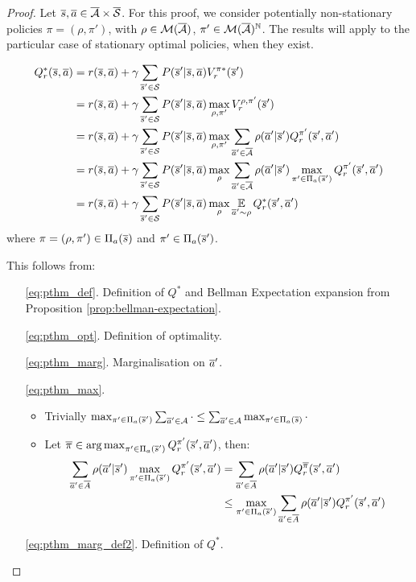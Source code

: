 \begin{proof}
Let $\overline{s}, \overline{a} \in \overline{\mathcal{A}}\times\overline{\mathcal{S}}$. For this proof, we consider  potentially non-stationary policies $\pi=(\rho, \pi')$, with $\rho\in\mathcal{M}(\overline{\mathcal{A}})$, $\pi'\in\mathcal{M}(\overline{\mathcal{A}})^{\mathbb{N}}$. The results will apply to the particular case of stationary optimal policies, when they exist.

\begin{align}
    Q_r^*(\overline{s}, \overline{a}) &=  r(\overline{s}, \overline{a}) + \gamma \sum_{\overline{s}'\in\mathcal{S}} P(\overline{s}' | \overline{s}, \overline{a}) V_r^{\pi*}(\overline{s}') \label{eq:pthm_def}\\
    &= r(\overline{s}, \overline{a}) + \gamma \sum_{\overline{s}'\in\mathcal{S}} P(\overline{s}' | \overline{s}, \overline{a})  \max_{\rho, \pi'} V_r^{\rho, \pi'}(\overline{s}') \label{eq:pthm_opt}\\
    &= r(\overline{s}, \overline{a}) + \gamma \sum_{\overline{s}'\in\mathcal{S}}  P(\overline{s}' | \overline{s}, \overline{a}) \max_{\rho, \pi'} \sum_{\overline{a}'\in\overline{\mathcal{A}}} \rho(\overline{a}' | \overline{s}')Q_r^{\pi'}(\overline{s}', \overline{a}') \label{eq:pthm_marg}\\
    &= r(\overline{s}, \overline{a}) + \gamma \sum_{\overline{s}'\in\mathcal{S}}  P(\overline{s}' | \overline{s}, \overline{a}) \max_\rho\sum_{\overline{a}'\in\overline{\mathcal{A}}}\rho(\overline{a}' | \overline{s}')\max_{\pi'\in\Pi_a(\overline{s}')}Q_r^{\pi'}(\overline{s}', \overline{a}') \label{eq:pthm_max}\\
    &= r(\overline{s}, \overline{a}) + \gamma \sum_{\overline{s}'\in\mathcal{S}}  P(\overline{s}' | \overline{s}, \overline{a}) \max_\rho\operatorname*{\mathbb{E}}\limits_{\overline{a}'\sim\rho}Q_r^*(\overline{s}', \overline{a}') \label{eq:pthm_marg_def2}
\end{align}
where $\pi = (\rho, \pi')\in\Pi_a(\overline{s})$ and $\pi'\in\Pi_a(\overline{s}')$.

This follows from:
\begin{enumerate}
\item[\eqref{eq:pthm_def}.] Definition of $Q^*$ and Bellman Expectation expansion from Proposition \ref{prop:bellman-expectation}. 
\item[\eqref{eq:pthm_opt}.] Definition of optimality.
\item[\eqref{eq:pthm_marg}.] Marginalisation on $\overline{a}'$.
\item[\eqref{eq:pthm_max}.] \begin{itemize}
    \item Trivially $\max_{\pi'\in\Pi_a(\overline{s}')} \sum_{\overline{a}'\in\mathcal{A}} \cdot \leq \sum_{\overline{a}'\in\mathcal{A}} \max_{ \pi'\in\Pi_a(\overline{s})} \cdot$
    \item Let $\overline{\pi}\in\operatorname*{arg\,max}_{\pi'\in\Pi_a(\overline{s}')} Q_r^{\pi'}(\overline{s}', \overline{a}')$, then:
    \begin{align*}
        \sum_{\overline{a}'\in\overline{A}}\rho(\overline{a}'|\overline{s}')\max_{\pi'\in\Pi_a(\overline{s}')}Q_r^{\pi'}(\overline{s}', \overline{a}') &= \sum_{\overline{a}'\in\overline{A}}\rho(\overline{a}'|\overline{s}')Q_r^{\overline{\pi}}(\overline{s}', \overline{a}') \\
        &\leq  \max_{\pi'\in\Pi_a(\overline{s}')} \sum_{\overline{a}'\in\overline{A}}\rho(\overline{a}'|\overline{s}')Q_r^{\pi'}(\overline{s}', \overline{a}')
    \end{align*}
\end{itemize}
\item[\eqref{eq:pthm_marg_def2}.] Definition of $Q^*$.
\end{enumerate}


\end{proof}
